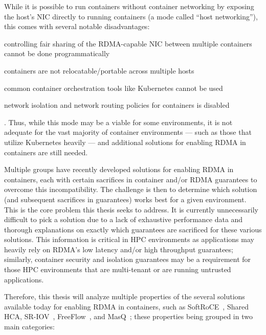 \documentclass[12pt,titlepage]{article}
\begin{document}
While it is possible to run containers without container networking by exposing the host's NIC directly to running containers (a mode called ``host networking''), this comes with several notable disadvantages:
\begin{enumerate*}[label={(\arabic*)},itemjoin*={{, and }},itemjoin={{, }}]
	\item controlling fair sharing of the RDMA-capable NIC between multiple containers cannot be done programmatically
	\item containers are not relocatable/portable across multiple hosts
	\item common container orchestration tools like Kubernetes cannot be used
	\item network isolation and network routing policies for containers is disabled
\end{enumerate*}.
Thus, while this mode may be a viable for some environments, it is not adequate for the vast majority of container environments --- such as those that utilize Kubernetes heavily --- and additional solutions for enabling RDMA in containers are still needed.

Multiple groups have recently developed solutions for enabling RDMA in containers, each with certain sacrifices in container and/or RDMA guarantees to overcome this incompatibility.
The challenge is then to determine which solution (and subsequent sacrifices in guarantees) works best for a given environment.
This is the core problem this thesis seeks to address.
It is currently unnecessarily difficult to pick a solution due to a lack of exhaustive performance data and thorough explanations on exactly which guarantees are sacrificed for these various solutions.
This information is critical in HPC environments as applications may heavily rely on RDMA's low latency and/or high throughput guarantees; similarly, container security and isolation guarantees may be a requirement for those HPC environments that are multi-tenant or are running untrusted applications.

Therefore, this thesis will analyze multiple properties of the several solutions available today for enabling RDMA in containers, such as SoftRoCE~\cite{pandeysroce}, Shared HCA, SR-IOV~\cite{mellanoxdockerroce}, FreeFlow~\cite{kim2019freeflow}, and MasQ~\cite{he2020masq};
these properties being grouped in two main categories:
\end{document}
